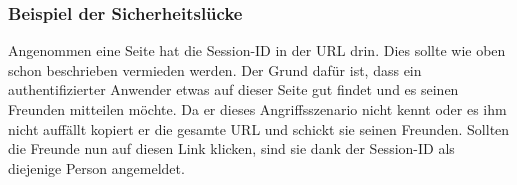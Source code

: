 \subsubsection{Beispiel der Sicherheitslücke}
Angenommen eine Seite hat die Session-ID in der URL drin. Dies sollte wie oben schon beschrieben vermieden werden. Der Grund dafür ist, dass ein authentifizierter Anwender etwas auf dieser Seite gut findet und es seinen Freunden mitteilen möchte. Da er dieses Angriffsszenario nicht kennt oder es ihm nicht auffällt kopiert er die gesamte URL und schickt sie seinen Freunden. Sollten die Freunde nun auf diesen Link klicken, sind sie dank der Session-ID als diejenige Person angemeldet.